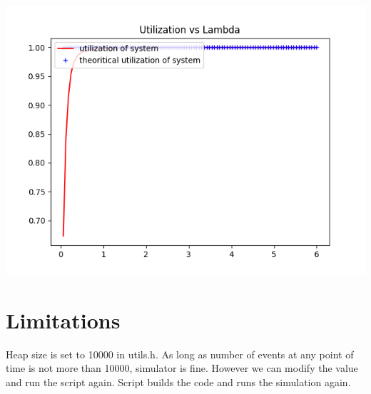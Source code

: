 \documentclass[11pt]{article}
\begin{document}
 \includegraphics{Utilization_L1000_K4_M2_U3}
 

 
 \section{Limitations}
 Heap size is set to 10000 in utils.h. As long as number of events at any point of time is not more than 10000, simulator is fine. However we can modify the value and run the script again. Script builds the code and runs the simulation again.
\end{document}
